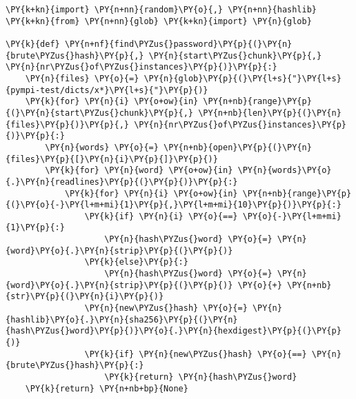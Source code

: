 \begin{Verbatim}[commandchars=\\\{\}]
\PY{k+kn}{import} \PY{n+nn}{random}\PY{o}{,} \PY{n+nn}{hashlib}
\PY{k+kn}{from} \PY{n+nn}{glob} \PY{k+kn}{import} \PY{n}{glob}

\PY{k}{def} \PY{n+nf}{find\PYZus{}password}\PY{p}{(}\PY{n}{brute\PYZus{}hash}\PY{p}{,} \PY{n}{start\PYZus{}chunk}\PY{p}{,} \PY{n}{nr\PYZus{}of\PYZus{}instances}\PY{p}{)}\PY{p}{:}
	\PY{n}{files} \PY{o}{=} \PY{n}{glob}\PY{p}{(}\PY{l+s}{"}\PY{l+s}{pympi-test/dicts/x*}\PY{l+s}{"}\PY{p}{)}
	\PY{k}{for} \PY{n}{i} \PY{o+ow}{in} \PY{n+nb}{range}\PY{p}{(}\PY{n}{start\PYZus{}chunk}\PY{p}{,} \PY{n+nb}{len}\PY{p}{(}\PY{n}{files}\PY{p}{)}\PY{p}{,} \PY{n}{nr\PYZus{}of\PYZus{}instances}\PY{p}{)}\PY{p}{:} 
		\PY{n}{words} \PY{o}{=} \PY{n+nb}{open}\PY{p}{(}\PY{n}{files}\PY{p}{[}\PY{n}{i}\PY{p}{]}\PY{p}{)}
		\PY{k}{for} \PY{n}{word} \PY{o+ow}{in} \PY{n}{words}\PY{o}{.}\PY{n}{readlines}\PY{p}{(}\PY{p}{)}\PY{p}{:}
			\PY{k}{for} \PY{n}{i} \PY{o+ow}{in} \PY{n+nb}{range}\PY{p}{(}\PY{o}{-}\PY{l+m+mi}{1}\PY{p}{,}\PY{l+m+mi}{10}\PY{p}{)}\PY{p}{:}
				\PY{k}{if} \PY{n}{i} \PY{o}{==} \PY{o}{-}\PY{l+m+mi}{1}\PY{p}{:}
					\PY{n}{hash\PYZus{}word} \PY{o}{=} \PY{n}{word}\PY{o}{.}\PY{n}{strip}\PY{p}{(}\PY{p}{)}
				\PY{k}{else}\PY{p}{:}
					\PY{n}{hash\PYZus{}word} \PY{o}{=} \PY{n}{word}\PY{o}{.}\PY{n}{strip}\PY{p}{(}\PY{p}{)} \PY{o}{+} \PY{n+nb}{str}\PY{p}{(}\PY{n}{i}\PY{p}{)}
				\PY{n}{new\PYZus{}hash} \PY{o}{=} \PY{n}{hashlib}\PY{o}{.}\PY{n}{sha256}\PY{p}{(}\PY{n}{hash\PYZus{}word}\PY{p}{)}\PY{o}{.}\PY{n}{hexdigest}\PY{p}{(}\PY{p}{)}
				\PY{k}{if} \PY{n}{new\PYZus{}hash} \PY{o}{==} \PY{n}{brute\PYZus{}hash}\PY{p}{:}
					\PY{k}{return} \PY{n}{hash\PYZus{}word}
	\PY{k}{return} \PY{n+nb+bp}{None}
\end{Verbatim}
